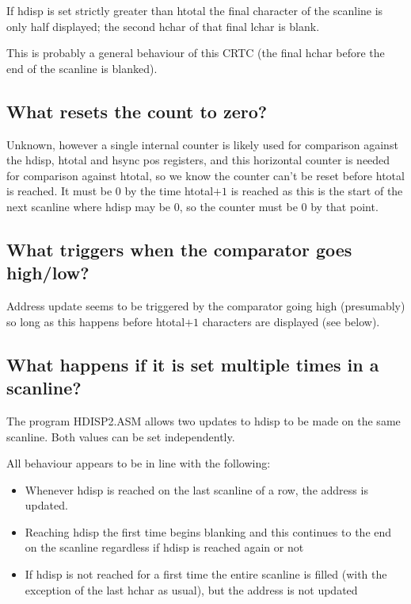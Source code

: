 \documentclass[a4paper,10pt]{amsart}
\begin{document}
If hdisp is set strictly greater than htotal the final character of the
scanline is only half displayed; the second hchar of that final lchar is blank.

This is probably a general behaviour of this CRTC (the final hchar before
the end of the scanline is blanked).

\subsection{What resets the count to zero?}

Unknown, however a single internal counter is likely used for comparison
against the hdisp, htotal and hsync pos registers, and this horizontal counter
is needed for comparison against htotal, so we know the counter can't be reset
before htotal is reached. It must be 0 by the time htotal$+1$ is reached as
this is the start of the next scanline where hdisp may be $0$, so the counter
must be $0$ by that point.

\subsection{What triggers when the comparator goes high/low?}

Address update seems to be triggered by the comparator going high (presumably)
so long as this happens before htotal$+1$ characters are displayed (see below).

\subsection{What happens if it is set multiple times in a scanline?}

The program HDISP2.ASM allows two updates to hdisp to be made on the same
scanline. Both values can be set independently.

All behaviour appears to be in line with the following:

\begin{itemize}
\item Whenever hdisp is reached on the last scanline of a row, the address is
      updated.
\item Reaching hdisp the first time begins blanking and this continues to the
      end on the scanline regardless if hdisp is reached again or not
\item If hdisp is not reached for a first time the entire scanline is filled
      (with the exception of the last hchar as usual), but the address is not
      updated
\end{itemize}
\end{document}
